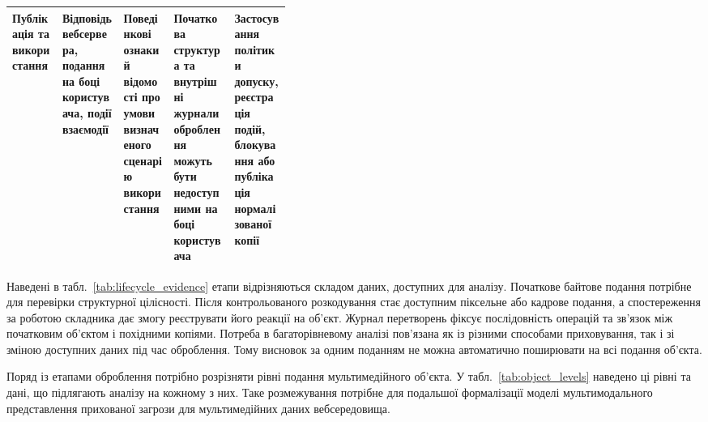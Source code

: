 \begin{landscape}
\begin{table}[H]
\begin{tabularx}{\linewidth}{>{\raggedright\arraybackslash}p{0.18\linewidth}>{\raggedright\arraybackslash}p{0.22\linewidth}YYY}
Публікація та використання & Відповідь вебсервера, подання на боці користувача, події взаємодії & Поведінкові ознаки й відомості про умови визначеного сценарію використання & Початкова структура та внутрішні журнали оброблення можуть бути недоступними на боці користувача & Застосування політики допуску, реєстрація подій, блокування або публікація нормалізованої копії \\
\bottomrule
\end{tabularx}
\endgroup
\end{table}
\end{landscape}

Наведені в табл.~\ref{tab:lifecycle_evidence} етапи відрізняються складом даних, доступних для аналізу. Початкове байтове подання потрібне для перевірки структурної цілісності. Після контрольованого розкодування стає доступним піксельне або кадрове подання, а спостереження за роботою складника дає змогу реєструвати його реакції на об’єкт. Журнал перетворень фіксує послідовність операцій та зв’язок між початковим об’єктом і похідними копіями. Потреба в багаторівневому аналізі пов’язана як із різними способами приховування, так і зі зміною доступних даних під час оброблення. Тому висновок за одним поданням не можна автоматично поширювати на всі подання об’єкта.

Поряд із етапами оброблення потрібно розрізняти рівні подання мультимедійного об’єкта. У табл.~\ref{tab:object_levels} наведено ці рівні та дані, що підлягають аналізу на кожному з них. Таке розмежування потрібне для подальшої формалізації моделі мультимодального представлення прихованої загрози для мультимедійних даних вебсередовища.

